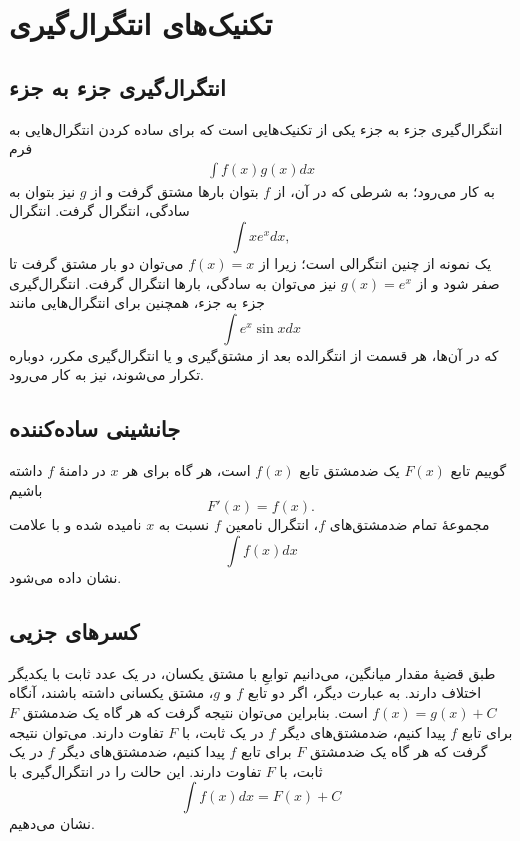 \section{تکنیک‌های انتگرال‌گیری}
\subsection{انتگرال‌گیری جزء به جزء}
انتگرال‌گیری جزء به جزء یکی از تکنیک‌هایی است که برای ساده کردن انتگرال‌هایی به فرم
\begin{align}
\int f(x) g(x) dx
\end{align}
به کار می‌رود؛ به شرطی که در آن، از  $f$ بتوان بارها مشتق گرفت و از $g$ نیز بتوان به سادگی، انتگرال گرفت. انتگرال 
\[
\int xe^x dx,
\]
یک نمونه از چنین انتگرالی است؛ زیرا از  $f(x)=x$ می‌توان دو بار مشتق گرفت تا صفر شود و از 
$g(x)=e^x$
نیز می‌توان به سادگی، بارها انتگرال گرفت. انتگرال‌گیری جزء به جزء، همچنین برای انتگرال‌هایی
مانند 
\[
\int e^x \sin x dx
\]
که در آن‌ها، هر قسمت از انتگرالده بعد از مشتق‌گیری و یا انتگرال‌گیری مکرر، دوباره تکرار می‌شوند، نیز به کار می‌رود. 

\subsection{جانشینی ساده‌کننده}
گوییم تابع $F(x)$ یک ضدمشتق تابع $f(x)$ است، هر گاه برای هر $x$ در
دامنهٔ $f$ داشته باشیم
\[
F'(x)=f(x).
\]
مجموعهٔ تمام ضدمشتق‌های $f$، انتگرال نامعین $f$ نسبت به
$x$
نامیده شده و با علامت
\[
\int f(x) dx
\]
نشان داده می‌شود.
\subsection{کسرهای جزیی}
طبق قضیهٔ مقدار میانگین، می‌دانیم توابعِ با مشتق یکسان، در یک عدد ثابت
 با یکدیگر اختلاف دارند. به عبارت دیگر، اگر  دو تابع $f$ و $g$، مشتق یکسانی داشته باشند، آنگاه $f(x)=g(x)+C$ است. بنابراین می‌توان نتیجه 
 گرفت که هر گاه یک ضدمشتق $F$ برای تابع $f$ پیدا کنیم، ضدمشتق‌های دیگر $f$ در یک ثابت، با $F$ تفاوت دارند.
 می‌توان نتیجه 
 گرفت که هر گاه یک ضدمشتق $F$ برای تابع $f$ پیدا کنیم، ضدمشتق‌های دیگر $f$ در یک ثابت، با $F$ تفاوت دارند. این حالت را در انتگرال‌گیری با 
\[
 \int f(x)dx= F(x)+C
\]
 نشان می‌دهیم.
